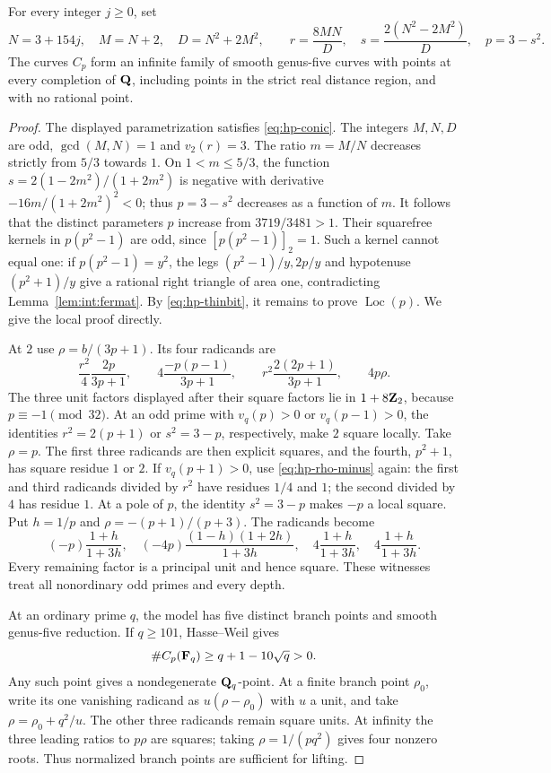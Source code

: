 \begin{theorem}\label{thm:hp-infinite}
For every integer $j\ge0$, set
\[
 N=3+154j,\quad M=N+2,\quad D=N^2+2M^2,\qquad
 r=\frac{8MN}{D},\quad s=\frac{2(N^2-2M^2)}D,\quad p=3-s^2.
\]
The curves $C_p$ form an infinite family of smooth genus-five curves
with points at every completion of $\mathbf Q$, including points in the
strict real distance region, and with no rational point.
\end{theorem}
\begin{proof}
The displayed parametrization satisfies \eqref{eq:hp-conic}.
The integers $M,N,D$ are odd, $\gcd(M,N)=1$ and $v_2(r)=3$.
The ratio $m=M/N$ decreases strictly from $5/3$ towards $1$.
On $1<m\le5/3$, the function
$s=2(1-2m^2)/(1+2m^2)$ is negative with derivative
$-16m/(1+2m^2)^2<0$; thus $p=3-s^2$ decreases as a function of $m$.
It follows that the distinct parameters $p$ increase from
$3719/3481>1$.
Their squarefree kernels in $p(p^2-1)$ are odd, since
$[p(p^2-1)]_2=1$.  Such a kernel cannot equal one:
if $p(p^2-1)=y^2$, the legs $(p^2-1)/y,2p/y$ and hypotenuse
$(p^2+1)/y$ give a rational right triangle of area one, contradicting
Lemma~\ref{lem:int:fermat}.
By \eqref{eq:hp-thinbit}, it remains to prove $\operatorname{Loc}(p)$.
We give the local proof directly.

At $2$ use $\rho=b/(3p+1)$.  Its four radicands are
\begin{equation}\label{eq:hp-rho-minus}
 \frac{r^2}{4}\frac{2p}{3p+1},\qquad
 4\frac{-p(p-1)}{3p+1},\qquad
 r^2\frac{2(2p+1)}{3p+1},\qquad
 4p\rho.
\end{equation}
The three unit factors displayed after their square factors lie in
$1+8\mathbf Z_2$, because $p\equiv-1\pmod {32}$.
At an odd prime with $v_q(p)>0$ or $v_q(p-1)>0$, the identities
$r^2=2(p+1)$ or $s^2=3-p$, respectively, make $2$ square locally.
Take $\rho=p$.  The first three radicands are then explicit squares,
and the fourth, $p^2+1$, has square residue $1$ or $2$.
If $v_q(p+1)>0$, use \eqref{eq:hp-rho-minus} again: the first and
third radicands divided by $r^2$ have residues $1/4$ and $1$;
the second divided by $4$ has residue $1$.
At a pole of $p$, the identity $s^2=3-p$ makes $-p$ a local square.
Put $h=1/p$ and $\rho=-(p+1)/(p+3)$.  The radicands become
\[
 (-p)\frac{1+h}{1+3h},\quad
 (-4p)\frac{(1-h)(1+2h)}{1+3h},\quad
 4\frac{1+h}{1+3h},\quad 4\frac{1+h}{1+3h}.
\]
Every remaining factor is a principal unit and hence square.
These witnesses treat all nonordinary odd primes and every depth.

At an ordinary prime $q$, the model has five distinct branch points
and smooth genus-five reduction.  If $q\ge101$, Hasse--Weil gives
\[
 \#C_p(\mathbf F_q)\ge q+1-10\sqrt q>0.
\]
Any such point gives a nondegenerate $\mathbf Q_q$-point.  At a finite branch
point $\rho_0$, write its one vanishing radicand as $u(\rho-\rho_0)$
with $u$ a unit, and take $\rho=\rho_0+q^2/u$.
The other three radicands remain square units.  At infinity the three
leading ratios to $p\rho$ are squares; taking
$\rho=1/(pq^2)$ gives four nonzero roots.  Thus normalized branch
points are sufficient for lifting.


\end{proof}
